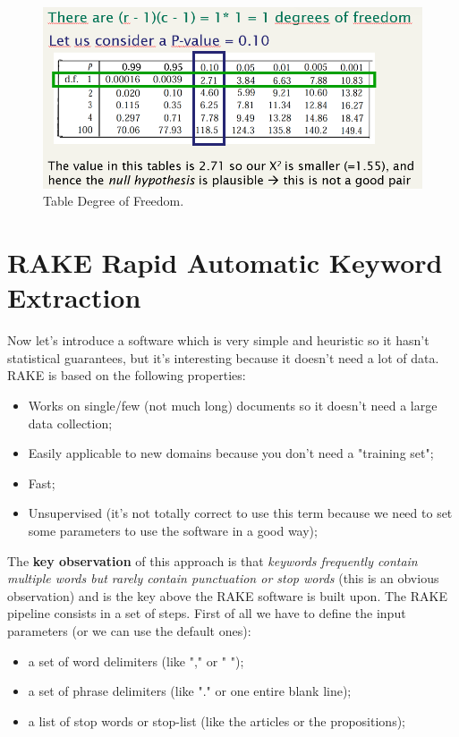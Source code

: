 \begin{figure}
    \centering
    \includegraphics[width=0.75\linewidth]{images/tablefreedom.png}
    \caption{Table Degree of Freedom.}
    \label{fig:tablefreedom}
\end{figure}
\section{RAKE Rapid Automatic Keyword Extraction}
Now let's introduce a software which is very simple and heuristic so it hasn't statistical guarantees, but it's interesting because it doesn't need a lot of data.\newline
RAKE is based on the following properties:
\begin{itemize}
    \item Works on single/few (not much long) documents so it doesn't need a large data collection;
    \item Easily applicable to new domains because you don't need a "training set";
    \item Fast;
    \item Unsupervised (it's not totally correct to use this term because we need to set some parameters to use the software in a good way);
\end{itemize}
The \textbf{key observation} of this approach is that \textit{keywords frequently contain multiple words but rarely contain punctuation or stop words} (this is an obvious observation) and is the key above the RAKE software is built upon.\newline
The RAKE pipeline consists in a set of steps. First of all we have to define the input parameters (or we can use the default ones):
\begin{itemize}
    \item a set of word delimiters (like "," or " ");
    \item a set of phrase delimiters (like "." or one entire blank line);
    \item a list of stop words or stop-list (like the articles or the propositions);
\end{itemize}
